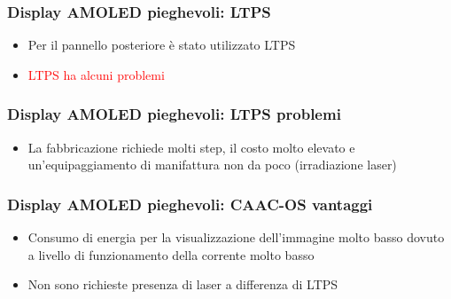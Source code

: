\documentclass[12pt]{beamer}
\begin{document}
	\begin{frame}
		\frametitle{Display AMOLED pieghevoli: LTPS}
		\begin{itemize}
			\item Per il pannello posteriore è stato utilizzato LTPS
			\pause
			\item \textcolor{red}{LTPS ha alcuni problemi}
		\end{itemize}
	\end{frame}
	\begin{frame}
		\frametitle{Display AMOLED pieghevoli: LTPS problemi}
		\begin{itemize}
			\item La fabbricazione richiede molti step, il costo molto elevato e un'equipaggiamento di manifattura non da poco (irradiazione laser)
		\end{itemize}
	\end{frame}
	\begin{frame}
		\frametitle{Display AMOLED pieghevoli: CAAC-OS vantaggi}
		\begin{itemize}
			\item Consumo di energia per la visualizzazione dell'immagine molto basso dovuto a livello di funzionamento della corrente molto basso
			\pause
			\item Non sono richieste presenza di laser a differenza di LTPS
		\end{itemize}
	\end{frame}
\end{document}
